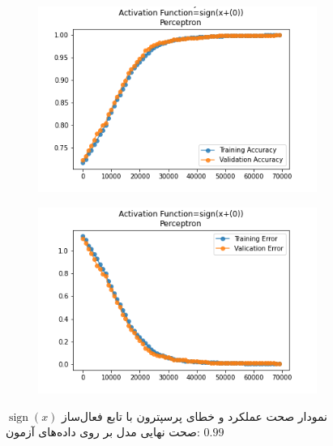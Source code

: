 \documentclass[12pt, a4paper]{article}
\DeclareMathOperator{\sign}{sign}
\begin{document}
\begin{figure}[h]
    \begin{subfigure}{0.45\linewidth}
        \centering
        \includegraphics[width=\linewidth]{images/3/perceptron/activation_func/1.png}
    \end{subfigure}
    \hfil
    \begin{subfigure}{0.45\linewidth}
        \centering
        \includegraphics[width=\linewidth]{images/3/perceptron/activation_func/2.png}
    \end{subfigure}
    \caption{نمودار صحت عملکرد‌ و خطای پرسپترون با تابع فعال‌ساز $\sign(x)$
    \newline
    صحت نهایی مدل بر روی داده‌های آزمون: $0.99$}
\end{figure}
\end{document}
